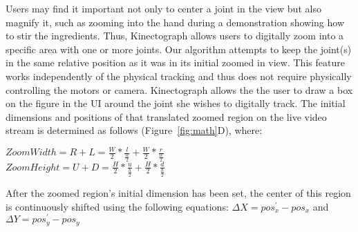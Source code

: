 Users may find it important not only to center a joint in the view but also magnify it, such as zooming into the hand during a demonstration showing how to stir the ingredients.
%
Thus, Kinectograph allows users to digitally zoom into a specific area with one or more joints. Our algorithm attempts to keep the joint(s) in the same relative position as it was in its initial zoomed in view. This feature works independently of the physical tracking and thus does not require physically controlling the motors or camera.
%
Kinectograph allows the the user to draw a box on the figure in the UI around the joint she wishes to digitally track. The initial dimensions and positions of that translated zoomed region on the live video stream is determined as follows (Figure~\ref{fig:math}D), where:

$ZoomWidth= R + L = \frac{W}{2}*\frac{l}{\frac{w}{2}} + \frac{W}{2}*\frac{r}{\frac{w}{2}}$ \\
$ZoomHeight= U + D = \frac{H}{2}*\frac{u}{\frac{h}{2}}+ \frac{H}{2}*\frac{d}{\frac{h}{2}}$

After the zoomed region's initial dimension has been set, the center of this region is continuously shifted using the following equations: $\Delta X = pos_{x}^{'}-pos_{x}$ and $\Delta Y = pos_{y}^{'}-pos_{y}$

